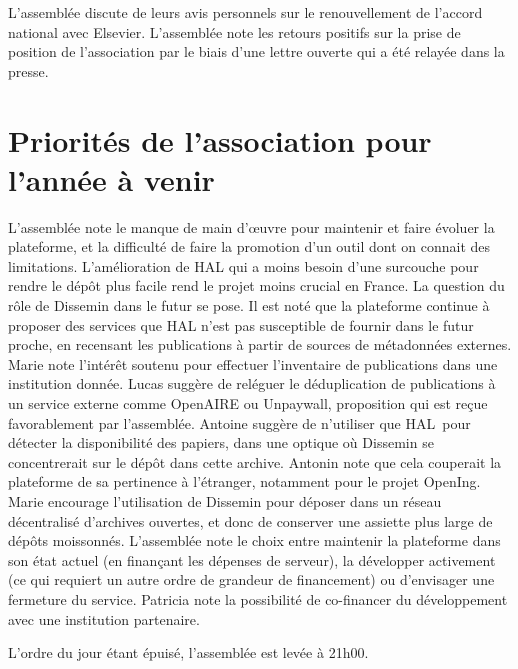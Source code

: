 \documentclass[a4paper]{article}
\begin{document}
L'assemblée discute de leurs avis personnels sur le renouvellement de l'accord national avec Elsevier. L'assemblée note les retours positifs sur la prise de position de l'association par le biais d'une lettre ouverte qui a été relayée dans la presse.

\section{Priorités de l'association pour l'année à venir}

L'assemblée note le manque de main d'œuvre pour maintenir et faire évoluer la plateforme,
et la difficulté de faire la promotion d'un outil dont on connait des limitations.
L'amélioration de HAL qui a moins besoin d'une surcouche pour rendre le dépôt plus facile
rend le projet moins crucial en France. La question du rôle de Dissemin dans le futur se pose. Il est noté que la plateforme continue à proposer des services que HAL n'est pas susceptible de fournir dans le futur proche, en recensant les publications à
partir de sources de métadonnées externes.
Marie note l'intérêt soutenu pour effectuer l'inventaire de publications dans une institution donnée.
Lucas suggère de reléguer le déduplication de publications à un service externe comme OpenAIRE ou Unpaywall, proposition qui est reçue favorablement par l'assemblée.
Antoine suggère de n'utiliser que HAL pour détecter la disponibilité des papiers, dans une optique où Dissemin se concentrerait sur le dépôt dans cette archive. Antonin note que cela couperait la plateforme de sa pertinence à l'étranger, notamment pour le
projet OpenIng.
Marie encourage l'utilisation de Dissemin pour déposer dans un réseau décentralisé d'archives ouvertes, et donc de conserver une assiette plus large de dépôts moissonnés.
L'assemblée note le choix entre maintenir la plateforme dans son état actuel (en finançant les dépenses de serveur), la développer activement (ce qui requiert un autre ordre de grandeur de financement) ou d'envisager une fermeture du service. Patricia note
la possibilité de co-financer du développement avec une institution partenaire.

L'ordre du jour étant épuisé, l'assemblée est levée à 21h00.
\end{document}
